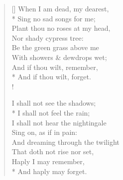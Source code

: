 \documentclass[MAIN]{subfiles}
\begin{document}
\settowidth{\versewidth}{When I am dead, my dearest,}
\begin{verse}[\versewidth]
When I am dead, my dearest,\\* 
\vin Sing no sad songs for me;\\
Plant thou no roses at my head,\\
\vin Nor shady cypress tree:\\
Be the green grass above me\\
\vin With showers \& dewdrops wet;\\
And if thou wilt, remember,\\*
\vin And if thou wilt, forget.\\!

I shall not see the shadows;\\*
\vin I shall not feel the rain;\\
I shall not hear the nightingale\\
\vin Sing on, as if in pain:\\
And dreaming through the twilight\\
\vin That doth not rise nor set,\\
Haply I may remember,\\*
\vin And haply may forget.
\end{verse}
\end{document}
